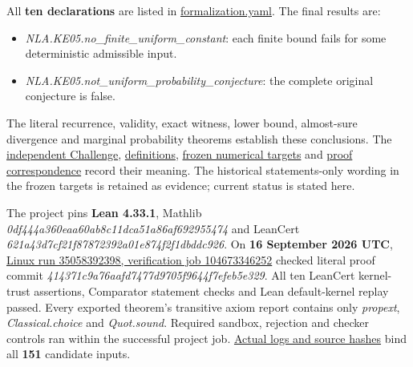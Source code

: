 \documentclass[11pt,a4paper]{article}
\providecommand{\tightlist}{\setlength{\itemsep}{0pt}\setlength{\parskip}{0pt}}
\begin{document}
All \textbf{ten declarations} are listed in
\href{https://github.com/ajt60gaibb/OpenProblemsInNLA/blob/main/randomized-and-low-rank-approximation/KE-05/lean/formalization.yaml}{formalization.yaml}.
The final results are:

\begin{itemize}
\tightlist
\item
  \textit{NLA.KE05.no\_finite\_uniform\_constant}: each finite bound
  fails for some deterministic admissible input.
\item
  \textit{NLA.KE05.not\_uniform\_probability\_conjecture}: the complete
  original conjecture is false.
\end{itemize}

The literal recurrence, validity, exact witness, lower bound,
almost-sure divergence and marginal probability theorems establish these
conclusions. The
\href{https://github.com/ajt60gaibb/OpenProblemsInNLA/blob/main/randomized-and-low-rank-approximation/KE-05/lean/Challenge.lean}{independent
Challenge},
\href{https://github.com/ajt60gaibb/OpenProblemsInNLA/blob/main/randomized-and-low-rank-approximation/KE-05/lean/NLA/KE05/Definitions.lean}{definitions},
\href{https://github.com/ajt60gaibb/OpenProblemsInNLA/blob/main/randomized-and-low-rank-approximation/KE-05/lean/NUMERICAL_TARGETS.md}{frozen
numerical targets} and
\href{https://github.com/ajt60gaibb/OpenProblemsInNLA/blob/main/randomized-and-low-rank-approximation/KE-05/lean/PROOF_NOTES.md}{proof
correspondence} record their meaning. The historical statements-only
wording in the frozen targets is retained as evidence; current status is
stated here.

The project pins \textbf{Lean 4.33.1}, Mathlib
\textit{0df444a360eaa60ab8c11dca51a86af692955474} and LeanCert
\textit{621a43d7cf21f87872392a01e874f2f1dbddc926}. On \textbf{16
September 2026 UTC},
\href{https://github.com/sgstepaniants/OpenProblemsInNLA/actions/runs/35058392398/job/104673346252}{Linux
run 35058392398, verification job 104673346252} checked literal proof
commit \textit{414371c9a76aafd7477d9705f9644f7efeb5e329}. All ten
LeanCert kernel-trust assertions, Comparator statement checks and Lean
default-kernel replay passed. Every exported theorem's transitive axiom
report contains only \textit{propext}, \textit{Classical.choice} and
\textit{Quot.sound}. Required sandbox, rejection and checker controls
ran within the successful project job.
\href{https://github.com/ajt60gaibb/OpenProblemsInNLA/blob/main/randomized-and-low-rank-approximation/KE-05/lean/verification/linux-2026-09-16/README.md}{Actual
logs and source hashes} bind all \textbf{151} candidate inputs.
\end{document}
